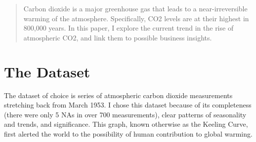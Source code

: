 \documentclass{article}
\begin{document}
\begin{abstract}
	Carbon dioxide is a major greenhouse gas that leads to a near-irreversible warming of the atmosphere. Specifically, CO2 levels are at their highest in 800,000 years. In this paper, I explore the current trend in the rise of atmospheric CO2, and link them to possible business insights. 
\end{abstract}

\section*{The Dataset}
The dataset of choice is series of atmospheric carbon dioxide measurements stretching back from March 1953. I chose this dataset because of its completeness (there were only 5 NAs in over 700 measurements), clear patterns of seasonality and trends, and significance. This graph, known otherwise as the Keeling Curve, first alerted the world to the possibility of human contribution to global warming.\\
\end{document}
